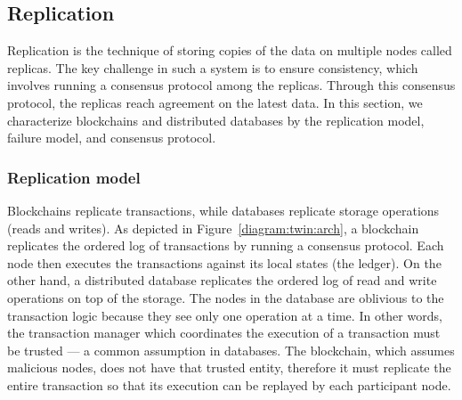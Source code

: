 \subsection{Replication}
\label{sec:replication} 

Replication is the technique of storing copies of the data on multiple nodes called replicas. The key challenge in such a system is to ensure consistency, which involves running a consensus protocol among the replicas. Through this consensus protocol, the replicas reach agreement on the latest data. In this section, we characterize blockchains and distributed databases by the replication model, failure model, and consensus protocol.

\subsubsection{Replication model}
Blockchains replicate transactions, while databases replicate storage operations (reads and writes). As
depicted in Figure~\ref{diagram:twin:arch}, a blockchain replicates the ordered log of transactions by running a
consensus protocol. Each node then executes the transactions against its local states (the ledger). On the
other hand, a distributed database replicates the ordered log of read and write operations on top of the
storage. The nodes in the database are oblivious to the transaction logic because they see only one operation at
a time. In other words, the transaction manager which coordinates the execution of a transaction must be
trusted --- a common assumption in databases. The blockchain, which assumes malicious nodes,
does not have that trusted entity, therefore it must replicate the entire transaction so that its execution can be replayed by each participant node. 

